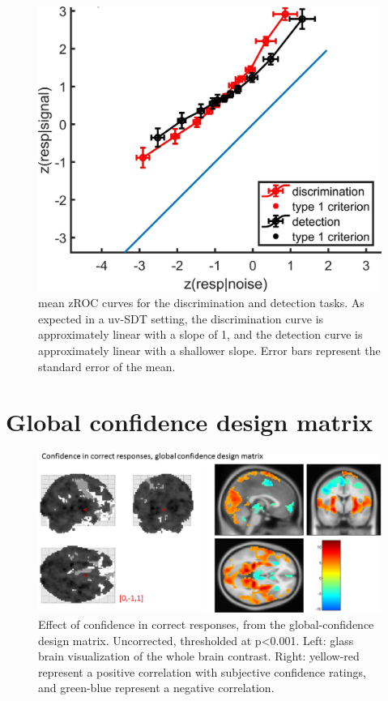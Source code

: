 \documentclass[12pt,twoside]{reedthesis}
\begin{document}
\begin{figure}
\includegraphics[width=\linewidth]{figure/ch3/zROC} \caption[zROC curves, imaging experiment]{mean zROC curves for the discrimination and detection tasks. As expected in a uv-SDT setting, the discrimination curve is approximately linear with a slope of 1, and the detection curve is approximately linear with a shallower slope. Error bars represent the standard error of the mean.}\label{fig:zROC}
\end{figure}
\hypertarget{app3:GC-DM}{%
\section{Global confidence design matrix}\label{app3:GC-DM}}
\begin{figure}
\includegraphics[width=\linewidth]{figure/ch3/GC-DM} \caption[Parametric effect of confidence in correct responses]{Effect of confidence in correct responses, from the global-confidence design matrix. Uncorrected, thresholded at p<0.001. Left: glass brain visualization of the whole brain contrast. Right: yellow-red represent a positive correlation with subjective confidence ratings, and green-blue represent a negative correlation.}\label{fig:GC-DM}
\end{figure}
\end{document}
